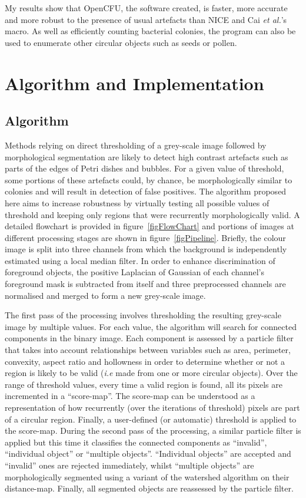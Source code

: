 \documentclass[10pt]{article}
\begin{document}
My results show that OpenCFU, the software created, is faster, more accurate and
more robust to the presence of usual artefacts than NICE and Cai \emph{et al.}'s macro.
As well as efficiently counting
bacterial colonies, the program can also 
be used to enumerate
other circular objects such as seeds or pollen. 

\section*{Algorithm and Implementation}

\subsection*{Algorithm} 
Methods relying on direct thresholding of a grey-scale image followed
by morphological segmentation are likely to detect high contrast artefacts such
as parts of the edges of Petri dishes and bubbles.  For a given value of threshold,
some portions of these artefacts could, by chance, be morphologically similar to colonies and will result in
detection of false positives.
The algorithm proposed here aims to increase robustness by virtually testing
all possible values of threshold and keeping only regions that were recurrently morphologically
valid. A detailed flowchart is provided in figure~\ref{figFlowChart} and portions of images 
at different processing stages are shown in figure~\ref{figPipeline}.
Briefly, the colour image is split into three channels from which the background
is independently estimated using a local median filter.
In order to enhance discrimination of foreground objects,  the positive
Laplacian of Gaussian of each channel's foreground mask is subtracted from
itself and three preprocessed channels are normalised and merged to form a
new grey-scale image.

The first pass of the processing involves thresholding the resulting grey-scale
image by multiple values.
For each value, the algorithm will search for connected components in the binary
image.
Each component is assessed by a particle filter that takes into account relationships
between variables such as area, perimeter, convexity, aspect ratio and
hollowness in order to determine whether or not a region is likely to be valid 
(\emph{i.e} made from one or more circular objects).
Over the range of threshold values, every time a valid region is found, all
its pixels are incremented in a ``score-map''.
The score-map can be understood as a representation of how recurrently (over the
iterations of threshold) pixels are part of a circular region. Finally,  a
user-defined (or automatic) threshold is applied to the score-map.
During the second pass of the processing, a similar particle filter is applied
but this time it classifies the connected components as ``invalid'',
``individual object'' or ``multiple objects''.
``Individual objects'' are accepted and ``invalid'' ones  are rejected
immediately, whilst ``multiple objects'' are morphologically segmented using a variant
of the watershed algorithm on their distance-map\cite{marotz_effective_2001}.
Finally, all segmented objects are reassessed by the particle filter.
\end{document}
